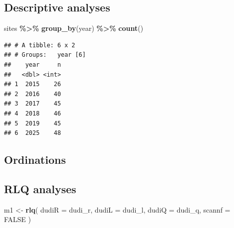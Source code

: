 \documentclass[
]{article}
\newenvironment{Shaded}{\begin{snugshade}}{\end{snugshade}}
\newcommand{\AttributeTok}[1]{\textcolor[rgb]{0.13,0.29,0.53}{#1}}
\newcommand{\ConstantTok}[1]{\textcolor[rgb]{0.56,0.35,0.01}{#1}}
\newcommand{\FunctionTok}[1]{\textcolor[rgb]{0.13,0.29,0.53}{\textbf{#1}}}
\newcommand{\NormalTok}[1]{#1}
\newcommand{\OtherTok}[1]{\textcolor[rgb]{0.56,0.35,0.01}{#1}}
\newcommand{\SpecialCharTok}[1]{\textcolor[rgb]{0.81,0.36,0.00}{\textbf{#1}}}
\begin{document}
\subsection{Descriptive analyses}\label{descriptive-analyses}

\begin{Shaded}
\begin{Highlighting}[]
\NormalTok{sites }\SpecialCharTok{\%\textgreater{}\%}
  \FunctionTok{group\_by}\NormalTok{(year) }\SpecialCharTok{\%\textgreater{}\%}
  \FunctionTok{count}\NormalTok{()}
\end{Highlighting}
\end{Shaded}

\begin{verbatim}
## # A tibble: 6 x 2
## # Groups:   year [6]
##    year     n
##   <dbl> <int>
## 1  2015    26
## 2  2016    40
## 3  2017    45
## 4  2018    46
## 5  2019    45
## 6  2025    48
\end{verbatim}

\subsection{Ordinations}\label{ordinations}

\begin{Shaded}
\end{Shaded}

\subsection{RLQ analyses}\label{rlq-analyses}

\begin{Shaded}
\begin{Highlighting}[]
\NormalTok{m1 }\OtherTok{\textless{}{-}} \FunctionTok{rlq}\NormalTok{(}
  \AttributeTok{dudiR =}\NormalTok{ dudi\_r, }
  \AttributeTok{dudiL =}\NormalTok{ dudi\_l, }
  \AttributeTok{dudiQ =}\NormalTok{ dudi\_q,}
  \AttributeTok{scannf =} \ConstantTok{FALSE}
\NormalTok{  )}
\end{Highlighting}
\end{Shaded}
\end{document}

